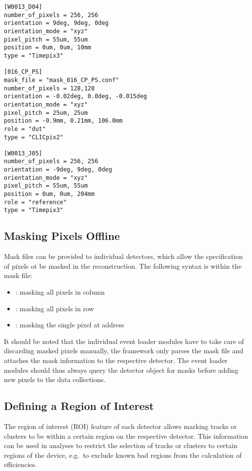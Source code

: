 \begin{verbatim}
[W0013_D04]
number_of_pixels = 256, 256
orientation = 9deg, 9deg, 0deg
orientation_mode = "xyz"
pixel_pitch = 55um, 55um
position = 0um, 0um, 10mm
type = "Timepix3"

[016_CP_PS]
mask_file = "mask_016_CP_PS.conf"
number_of_pixels = 128,128
orientation = -0.02deg, 0.0deg, -0.015deg
orientation_mode = "xyz"
pixel_pitch = 25um, 25um
position = -0.9mm, 0.21mm, 106.0mm
role = "dut"
type = "CLICpix2"

[W0013_J05]
number_of_pixels = 256, 256
orientation = -9deg, 9deg, 0deg
orientation_mode = "xyz"
pixel_pitch = 55um, 55um
position = 0um, 0um, 204mm
role = "reference"
type = "Timepix3"
\end{verbatim}

\subsection{Masking Pixels Offline}
\label{sec:masking}

Mask files can be provided to individual detectors, which allow the specification of pixels ot be masked in the reconstruction.
The following syntax is within the mask file:
\begin{itemize}
    \item {}: masking all pixels in column 
    \item {}: masking all pixels in row 
    \item {}: masking the single pixel at address 
\end{itemize}

\begin{warning}
It should be noted that the individual event loader modules have to take care of discarding masked pixels manually, the \corry framework only parses the mask file and attaches the mask information to the respective detector. The event loader modules should thus always query the detector object for masks before adding new pixels to the data collections.
\end{warning}

\subsection{Defining a Region of Interest}
\label{sec:roi}

The region of interest (ROI) feature of each detector allows marking tracks or clusters to be within a certain region on the respective detector.
This information can be used in analyses to restrict the selection of tracks or clusters to certain regions of the device, e.g.\ to exclude known bad regions from the calculation of efficiencies.

